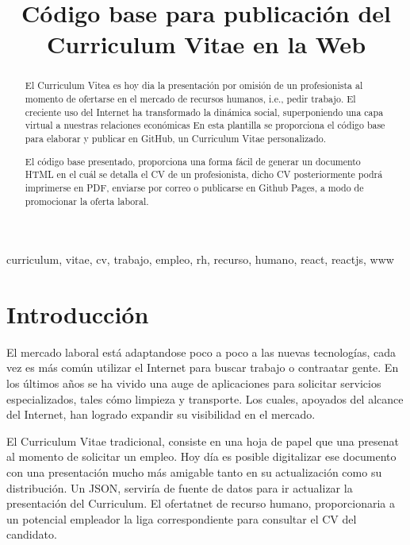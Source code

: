 \documentclass[conference]{IEEEtran}
\begin{document}
  \title{Código base para publicación del Curriculum Vitae en la Web}

  \author{
  }

  \maketitle

  \begin{abstract}
    El Curriculum Vitea es hoy dia la presentación por omisión de un profesionista al momento de ofertarse en el mercado de recursos humanos, i.e., pedir trabajo. El creciente uso del Internet ha transformado la dinámica social, superponiendo una capa virtual a nuestras relaciones económicas
    En esta plantilla se proporciona el código base para elaborar y publicar en GitHub, un Curriculum Vitae personalizado.

    El código base presentado, proporciona una forma fácil de generar un documento HTML en el cuál se detalla el CV de un profesionista, dicho CV posteriormente podrá imprimerse en PDF, enviarse por correo o publicarse en Github Pages, a modo de promocionar la oferta laboral.
  \end{abstract}

  \begin{IEEEkeywords}
    curriculum, vitae, cv, trabajo, empleo, rh, recurso, humano, react, reactjs, www
  \end{IEEEkeywords}

  \section{Introducción}
    El mercado laboral está adaptandose poco a poco a las nuevas tecnologías, cada vez es más común utilizar el Internet para buscar trabajo o contraatar gente. En los últimos años se ha vivido una auge de aplicaciones para solicitar servicios especializados, tales cómo limpieza y transporte. Los cuales, apoyados del alcance del Internet, han logrado expandir su visibilidad en el mercado.

    El Curriculum Vitae tradicional, consiste en una hoja de papel que una presenat al momento de solicitar un empleo. Hoy día es posible digitalizar ese documento con una presentación mucho más amigable tanto en su actualización como su distribución. Un JSON, serviría de fuente de datos para ir actualizar la presentación del Curriculum. El ofertatnet de recurso humano, proporcionaria a un potencial empleador la liga correspondiente para consultar el CV del candidato.
\end{document}
